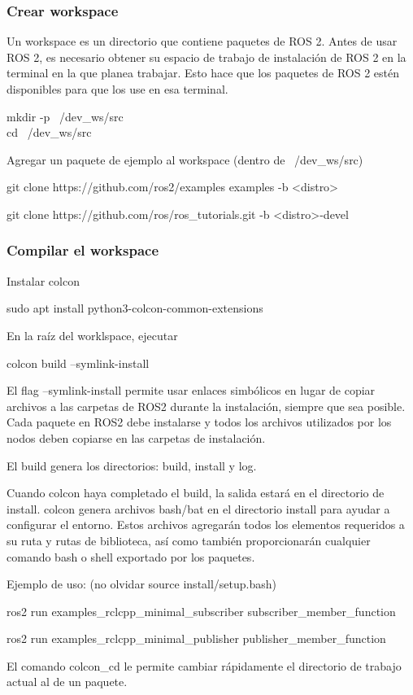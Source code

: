 \begin{frame}
    \frametitle{Crear workspace}
    
    Un workspace es un directorio que contiene paquetes de ROS 2. Antes de usar ROS 2, es necesario obtener su espacio de trabajo de instalación de ROS 2 en la terminal en la que planea trabajar. Esto hace que los paquetes de ROS 2 estén disponibles para que los use en esa terminal.
    
    mkdir -p ~/dev\_ws/src\\
    cd ~/dev\_ws/src
    
    Agregar un paquete de ejemplo al workspace (dentro de ~/dev\_ws/src)
    
    git clone https://github.com/ros2/examples examples -b <distro>
    
    
    git clone https://github.com/ros/ros\_tutorials.git -b <distro>-devel
    
 
\end{frame}


\begin{frame}
	\frametitle{Compilar el workspace}

	Instalar colcon
	
	sudo apt install python3-colcon-common-extensions
	
	En la raíz del worklspace, ejecutar
	
	colcon build --symlink-install
	
	El flag --symlink-install permite usar enlaces simbólicos en lugar de copiar archivos a las carpetas de ROS2 durante la instalación, siempre que sea posible. Cada paquete en ROS2 debe instalarse y todos los archivos utilizados por los nodos deben copiarse en las carpetas de instalación.
	
	El build genera los directorios: build, install y log.
	
	Cuando colcon haya completado el build, la salida estará en el directorio de install.  colcon genera archivos bash/bat en el directorio install para ayudar a configurar el entorno. Estos archivos agregarán todos los elementos requeridos a su ruta y rutas de biblioteca, así como también proporcionarán cualquier comando bash o shell exportado por los paquetes.
	
	Ejemplo de uso: (no olvidar source install/setup.bash)
	
	ros2 run examples\_rclcpp\_minimal\_subscriber subscriber\_member\_function
	
	ros2 run examples\_rclcpp\_minimal\_publisher publisher\_member\_function
	
	El comando colcon\_cd le permite cambiar rápidamente el directorio de trabajo actual al de un paquete.
	
\end{frame}


